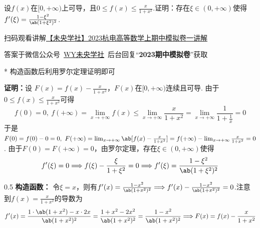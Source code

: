 \begin{problem}
    设$f(x)$在$[0,+\infty)$上可导，且$0\leq f(x) \leq \frac{x}{1+x^2}$.证明：存在$\xi \in (0,+\infty)$使得$f'(\xi) =\frac{1-\xi ^2}{\ab(1+\xi ^2 )^2}$.
\end{problem}
\begin{draft}
\begin{minipage}{0.81\textwidth}
\begin{flushright}\color{black}
        扫码观看讲解\href{https://b23.tv/W2KQlsI}{【未央学社】2023杭电高等数学上期中模拟卷一讲解}

        答案于微信公众号~\href{http://weixin.qq.com/r/mhKYgFTEMQlOrRDj90eI}{WY未央学社}~后台回复“\textbf{2023期中模拟卷}”获取
\end{flushright}
\end{minipage}
\begin{minipage}{0.15\textwidth}
\end{minipage}
\end{draft}
\begin{solution}*
    构造函数后利用罗尔定理证明即可

    \textbf{证明：}设
    $F(x) =f(x) -\frac{x}{1+x^2}$，$F(x)$在$[0,+\infty)$连续且可导. 由于$0\leq f(x) \leq \frac{x}{1+x^2}$可得
\[f(0) =0,\ f(+\infty) =\lim_{x\to +\infty} f(x) \leq \lim_{x\to +\infty} \frac{x}{1+x^2}=\lim_{x\to +\infty} \frac{1}{1+\frac{1}{x}}=0\]
于是$F(0) =f(0) -0=0,\ F(+\infty) =\lim_{x\to +\infty}\ab[f(x) -\frac{x}{1+x^2} ] =f(+\infty) -\lim_{x\to +\infty} \frac{x}{1+x^2}=0$. 由于$F(0) =F(+\infty) =0$，由罗尔定理，存在$\xi \in (0,+\infty)$使得
\[f'(\xi) =0\Longrightarrow f(\xi) -\frac{\xi}{1+\xi ^2}=0\Longrightarrow f'(\xi) =\frac{1-\xi ^2}{\ab(1+\xi^2)^2}\]
\footnotesize
    \begin{spacing}{0.5}
        \textbf{构造函数：}
        令$\xi =x$，则有$f'(x) =\frac{1-x^2}{\ab(1+x^2)^2}\Longrightarrow f'(x) -\frac{1-x^2}{\ab(1+x^2)^2}=0$.注意到$f(x) =\frac{x}{1+x^2}$的导数为
        \[f'(x) =\frac{1\cdot \ab(1+x^2)-x\cdot 2x}{\ab(1+x^2)^2}=\frac{1+x^2-2x^2}{\ab(1+x^2)^2}=\frac{1-x^2}{\ab(1+x^2)^2}\Longrightarrow F(x) =f(x) -\frac{x}{1+x^2}\]
    \end{spacing}
\end{solution}